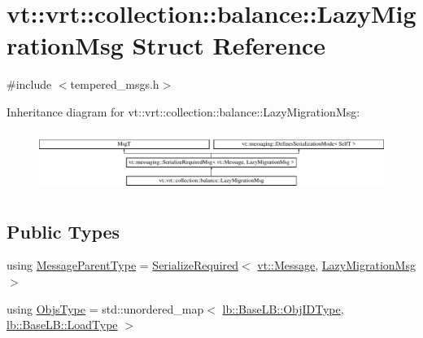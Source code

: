 \hypertarget{structvt_1_1vrt_1_1collection_1_1balance_1_1_lazy_migration_msg}{}\section{vt\+:\+:vrt\+:\+:collection\+:\+:balance\+:\+:Lazy\+Migration\+Msg Struct Reference}
\label{structvt_1_1vrt_1_1collection_1_1balance_1_1_lazy_migration_msg}


{\ttfamily \#include $<$tempered\+\_\+msgs.\+h$>$}

Inheritance diagram for vt\+:\+:vrt\+:\+:collection\+:\+:balance\+:\+:Lazy\+Migration\+Msg\+:\begin{figure}[H]
\begin{center}
\leavevmode
\includegraphics[height=1.962617cm]{structvt_1_1vrt_1_1collection_1_1balance_1_1_lazy_migration_msg}
\end{center}
\end{figure}
\subsection*{Public Types}
\begin{DoxyCompactItemize}
\item 
using \hyperlink{structvt_1_1vrt_1_1collection_1_1balance_1_1_lazy_migration_msg_ae85922f15b423b53083cccda06ef0b45}{Message\+Parent\+Type} = \hyperlink{namespacevt_a9e60e2e8929828639383ac1d6643384d}{Serialize\+Required}$<$ \hyperlink{namespacevt_a3a3ddfef40b4c90915fa43cdd5f129ea}{vt\+::\+Message}, \hyperlink{structvt_1_1vrt_1_1collection_1_1balance_1_1_lazy_migration_msg}{Lazy\+Migration\+Msg} $>$
\item 
using \hyperlink{structvt_1_1vrt_1_1collection_1_1balance_1_1_lazy_migration_msg_a8d71e0015ee1e05da54701cae56ef31c}{Objs\+Type} = std\+::unordered\+\_\+map$<$ \hyperlink{structvt_1_1vrt_1_1collection_1_1lb_1_1_base_l_b_a790b22acf448880599724749cdc4e9b3}{lb\+::\+Base\+L\+B\+::\+Obj\+I\+D\+Type}, \hyperlink{structvt_1_1vrt_1_1collection_1_1lb_1_1_base_l_b_a215e22b9f12678303f49615ae3be05cc}{lb\+::\+Base\+L\+B\+::\+Load\+Type} $>$
\end{DoxyCompactItemize}
